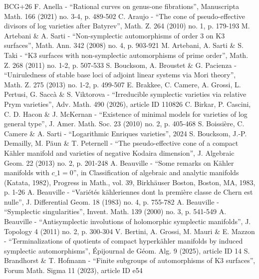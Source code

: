 \documentclass[10pt]{amsart}
\theoremstyle{plain}
\theoremstyle{definition}
\begin{document}
\begin{thebibliography}{BCG+26}
 F. Anella - “Rational curves on genus-one fibrations”, Manuscripta Math. 166 (2021) no. 3-4, p. 489-502
 C. Araujo - “The cone of pseudo-effective divisors of log varieties after Batyrev”, Math. Z. 264 (2010) no. 1, p. 179-193
 M. Artebani \& A. Sarti - “Non-symplectic automorphisms of order 3 on K3 surfaces”, Math. Ann. 342 (2008) no. 4, p. 903-921
 M. Artebani, A. Sarti \& S. Taki - “K3 surfaces with non-symplectic automorphisms of prime order”, Math. Z. 268 (2011) no. 1-2, p. 507-533
 S. Boucksom, A. Broustet \& G. Pacienza - “Uniruledness of stable base loci of adjoint linear systems via Mori theory”, Math. Z. 275 (2013) no. 1-2, p. 499-507
 E. Brakkee, C. Camere, A. Grossi, L. Pertusi, G. Saccà \& S. Viktorova - “Irreducible symplectic varieties via relative Prym varieties”, Adv. Math. 490 (2026), article ID 110826
 C. Birkar, P. Cascini, C. D. Hacon \& J. McKernan - “Existence of minimal models for varieties of log general type”, J. Amer. Math. Soc. 23 (2010) no. 2, p. 405-468
 S. Boissière, C. Camere \& A. Sarti - “Logarithmic Enriques varieties”, 2024
 S. Boucksom, J.-P. Demailly, M. Păun \& T. Peternell - “The pseudo-effective cone of a compact Kähler manifold and varieties of negative Kodaira dimension”, J. Algebraic Geom. 22 (2013) no. 2, p. 201-248
 A. Beauville - “Some remarks on Kähler manifolds with $c\_{1}=0$”, in Classification of algebraic and analytic manifolds (Katata, 1982), Progress in Math., vol. 39, Birkhäuser Boston, Boston, MA, 1983, p. 1-26
 A. Beauville - “Variétés kähleriennes dont la première classe de Chern est nulle”, J. Differential Geom. 18 (1983) no. 4, p. 755-782
 A. Beauville - “Symplectic singularities”, Invent. Math. 139 (2000) no. 3, p. 541-549
 A. Beauville - “Antisymplectic involutions of holomorphic symplectic manifolds”, J. Topology 4 (2011) no. 2, p. 300-304
 V. Bertini, A. Grossi, M. Mauri \& E. Mazzon - “Terminalizations of quotients of compact hyperkähler manifolds by induced symplectic automorphisms”, Épijournal de Géom. Alg. 9 (2025), article ID 14
 S. Brandhorst \& T. Hofmann - “Finite subgroups of automorphisms of K3 surfaces”, Forum Math. Sigma 11 (2023), article ID e54

\end{thebibliography}
\end{document}
